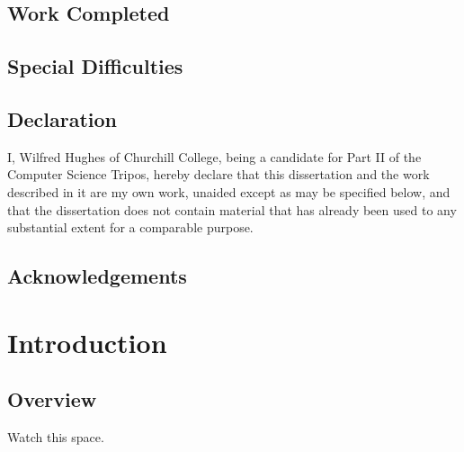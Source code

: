 \documentclass[12pt,twoside,notitlepage]{report}
\begin{document}
\section*{Work Completed}

\section*{Special Difficulties}
 
\newpage
\section*{Declaration}

I, Wilfred Hughes of Churchill College, being a candidate for Part II
of the Computer Science Tripos, hereby declare that this dissertation
and the work described in it are my own work, unaided except as may be
specified below, and that the dissertation does not contain material
that has already been used to any substantial extent for a comparable
purpose.

\bigskip
{}

\medskip
{}

\cleardoublepage

\tableofcontents

\listoffigures

\newpage
\section*{Acknowledgements}



\cleardoublepage        %

\setcounter{page}{1}
\pagestyle{headings}

\chapter{Introduction}


\section{Overview}
Watch this space.
\end{document}
